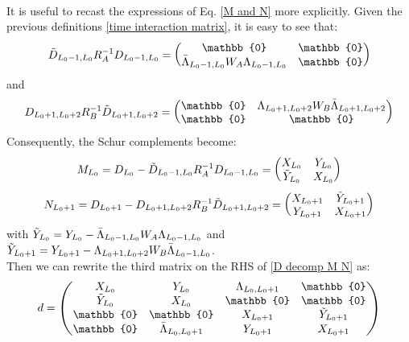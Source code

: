 \\ It is useful to recast the expressions of Eq. \eqref{M and N} more explicitly. Given the previous definitions \eqref{time interaction matrix}, it is easy to see that:
\begin{equation}
    \Tilde{D}_{L_0 - 1, L_0} R_A^{-1} D_{L_0 - 1, L_0} = \begin{pmatrix}
        \mathbb{0} & \mathbb{0} \\
        \Bar{\Lambda}_{L_0 - 1, L_0} W_A \Lambda_{L_0 - 1, L_0} & \mathbb{0} \\
    \end{pmatrix}
\end{equation}
and
\begin{equation}
    D_{L_0 + 1, L_0 + 2} R_B^{-1} \Tilde{D}_{L_0 + 1, L_0 + 2} = \begin{pmatrix}
        \mathbb{0} & \Lambda_{L_0 + 1, L_0 + 2} W_B \Bar{\Lambda}_{L_0 + 1, L_0 + 2} \\
        \mathbb{0} & \mathbb{0} \\
    \end{pmatrix}
\end{equation}
Consequently, the Schur complements become:
\begin{equation}
    M_{L_0} = D_{L_0} -  \Tilde{D}_{L_0 - 1, L_0} R_A^{-1} D_{L_0 - 1, L_0} = \begin{pmatrix}
        X_{L_0} & Y_{L_0} \\
       \Tilde{Y}_{L_0} & X_{L_0} \\ 
    \end{pmatrix}
\end{equation}
\begin{equation}
    N_{L_0 + 1} = D_{L_0 + 1} -  D_{L_0 + 1, L_0 + 2} R_B^{-1} \Tilde{D}_{L_0 + 1, L_0 + 2} = \begin{pmatrix}
        X_{L_0 + 1} & \Tilde{Y}_{L_0 + 1} \\
        Y_{L_0 + 1} & X_{L_0 + 1} \\ 
    \end{pmatrix}
\end{equation}
with $\Tilde{Y}_{L_0} = Y_{L_0} - \Bar{\Lambda}_{L_0 - 1, L_0} W_A \Lambda_{L_0 - 1, L_0}$ and $\Tilde{Y}_{L_0 + 1} = Y_{L_0 + 1} - \Lambda_{L_0 + 1, L_0 + 2} W_B \Bar{\Lambda}_{L_0 - 1, L_0}$.
\\ Then we can rewrite the third matrix on the RHS of \eqref{D decomp M N} as:
\begin{equation}
    d = \begin{pmatrix}
        X_{L_0} & Y_{L_0} & \Lambda_{L_0, L_0 + 1} & \mathbb{0} \\
        \Tilde{Y}_{L_0} & X_{L_0} & \mathbb{0} & \mathbb{0} \\
        \mathbb{0} & \mathbb{0} & X_{L_0 + 1} & \Tilde{Y}_{L_0 + 1} \\
        \mathbb{0} & \Bar{\Lambda}_{L_0, L_0 + 1} & Y_{L_0 + 1} & X_{L_0 + 1} \\ 
    \end{pmatrix}
\end{equation}
